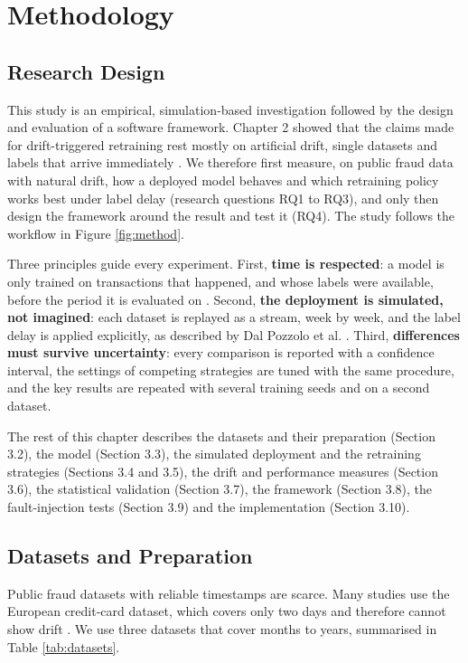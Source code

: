 \chapter{Methodology}

\section{Research Design}

This study is an empirical, simulation-based investigation followed by the design and evaluation of a software framework. Chapter 2 showed that the claims made for drift-triggered retraining rest mostly on artificial drift, single datasets and labels that arrive immediately \cite{shakil2025,wong2025,yelleti2025}. We therefore first measure, on public fraud data with natural drift, how a deployed model behaves and which retraining policy works best under label delay (research questions RQ1 to RQ3), and only then design the framework around the result and test it (RQ4). The study follows the workflow in Figure \ref{fig:method}.

Three principles guide every experiment. First, \textbf{time is respected}: a model is only trained on transactions that happened, and whose labels were available, before the period it is evaluated on \cite{menezes2025}. Second, \textbf{the deployment is simulated, not imagined}: each dataset is replayed as a stream, week by week, and the label delay is applied explicitly, as described by Dal Pozzolo et al. \cite{dalpozzolo2018}. Third, \textbf{differences must survive uncertainty}: every comparison is reported with a confidence interval, the settings of competing strategies are tuned with the same procedure, and the key results are repeated with several training seeds and on a second dataset.

The rest of this chapter describes the datasets and their preparation (Section 3.2), the model (Section 3.3), the simulated deployment and the retraining strategies (Sections 3.4 and 3.5), the drift and performance measures (Section 3.6), the statistical validation (Section 3.7), the framework (Section 3.8), the fault-injection tests (Section 3.9) and the implementation (Section 3.10).

\section{Datasets and Preparation}

Public fraud datasets with reliable timestamps are scarce. Many studies use the European credit-card dataset, which covers only two days and therefore cannot show drift \cite{dang2021,mienye2023}. We use three datasets that cover months to years, summarised in Table \ref{tab:datasets}.

